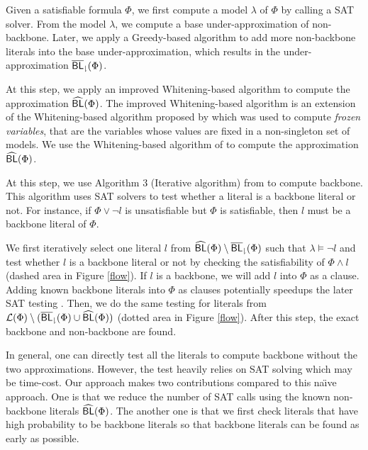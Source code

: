 \medskip
{}
Given a satisfiable formula $\Phi$, we first compute a model $\lambda$ of $\Phi$ by calling a SAT solver.
From the model $\lambda$, we compute a base under-approximation of non-backbone.
Later, we apply a Greedy-based algorithm to add more non-backbone literals into the base under-approximation, which results in the
under-approximation ${\sf \overline{BL}_\downharpoonright}(\Phi)$.



\medskip
{}
At this step, we apply an improved Whitening-based algorithm to compute the approximation ${\sf \widehat{BL}}(\Phi)$.
The improved Whitening-based algorithm is an extension of the Whitening-based algorithm proposed by \cite{LMZ09} which
was used to compute \emph{frozen variables}, that are the variables whose values are fixed in a non-singleton set of models.
We use the Whitening-based algorithm of \cite{LMZ09} to compute the approximation ${\sf \widehat{BL}}(\Phi)$. %


\medskip
{}
At this step, we use Algorithm 3 (Iterative algorithm) from \cite{JLM15} to compute backbone.
This algorithm uses SAT solvers to test whether a literal is a backbone literal or not.
For instance, if $\Phi\vee \neg l$ is unsatisfiable but $\Phi$ is satisfiable, then $l$ must be a backbone literal of $\Phi$.


We first iteratively select one literal $l$ from ${\sf \widehat{BL}}(\Phi)\setminus {\sf \overline{BL}_\downharpoonright}(\Phi)$ such that $\lambda \models \neg l$ and test whether
$l$ is a backbone literal or not by checking the satisfiability of $\Phi\wedge l$ (dashed area in Figure \ref{flow}).
If $l$ is a backbone, we will add $l$ into $\Phi$ as a clause. Adding known backbone literals into $\Phi$ as clauses potentially speedups the later SAT testing \cite{JLM15,MPA2015}.
Then, we do the same testing for literals from ${\cal L}(\Phi)\setminus ({\sf \overline{BL}_\downharpoonright}(\Phi)\cup{\sf \widehat{BL}}(\Phi))$ (dotted area in Figure \ref{flow}).
After this step, the exact backbone and non-backbone are found.


In general, one can directly test all the literals to compute backbone without the two approximations.
However, the test heavily relies on SAT solving which may be time-cost.
Our approach makes two contributions compared to this na\"{\i}ve approach.
One is that we reduce the number of SAT calls using the known non-backbone literals ${\sf \widehat{BL}}(\Phi)$.
The another one is that we first check literals that have high probability to be backbone literals so that backbone literals can be found as early as possible.


